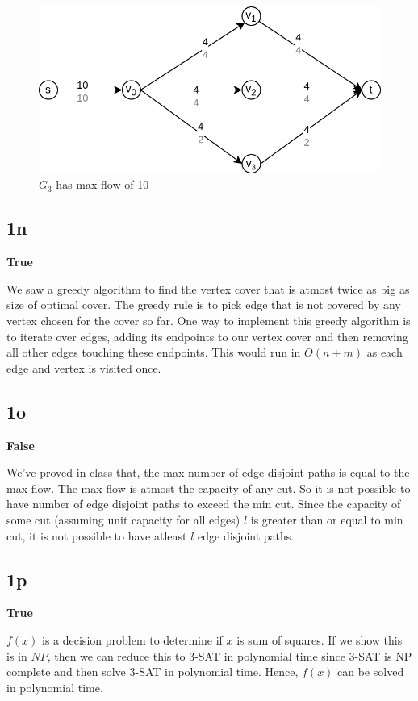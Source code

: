 \documentclass{article}
\begin{document}
    \begin{figure}[H]
        \includegraphics[width=1\textwidth]{maxflow3.png}
        \caption{$G_3$ has max flow of 10}
    \end{figure}

    \subsection*{1n}
    \textbf{True}

    We saw a greedy algorithm to find the vertex cover that is atmost twice as big as size of optimal cover. The greedy rule is to pick edge that is not covered by any vertex chosen for the cover so far. One way to implement this greedy algorithm is to iterate over edges, adding its endpoints to our vertex cover and then removing all other edges touching these endpoints. This would run in $O(n+m)$ as each edge and vertex is visited once.

    \subsection*{1o}
    \textbf{False}

    We've proved in class that, the max number of edge disjoint paths is equal to the max flow. The max flow is atmost the capacity of any cut. So it is not possible to have number of edge disjoint paths to exceed the min cut. Since the capacity of some cut (assuming unit capacity for all edges) $l$ is greater than or equal to min cut, it is not possible to have atleast $l$ edge disjoint paths.

    \subsection*{1p}
    \textbf{True}

    $f(x)$ is a decision problem to determine if $x$ is sum of squares. If we show this is in $NP$, then we can reduce this to 3-SAT in polynomial time since 3-SAT is NP complete and then solve 3-SAT in polynomial time. Hence, $f(x)$ can be solved in polynomial time.
\end{document}
